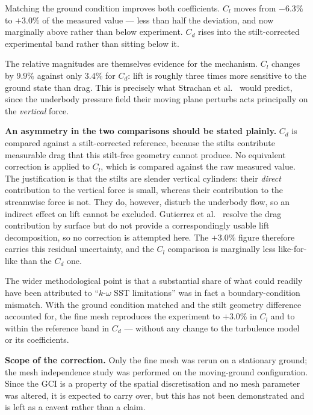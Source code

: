 \documentclass[12pt,a4paper]{article}
\begin{document}
\noindent
Matching the ground condition improves both coefficients. $C_l$ moves from $-6.3\%$ to $+3.0\%$ of
the measured value — less than half the deviation, and now marginally above rather than below
experiment. $C_d$ rises into the stilt-corrected experimental band rather than sitting below it.

The relative magnitudes are themselves evidence for the mechanism. $C_l$ changes by $9.9\%$ against
only $3.4\%$ for $C_d$: lift is roughly three times more sensitive to the ground state than drag.
This is precisely what Strachan et al.~\cite{strachan2007} would predict, since the underbody
pressure field their moving plane perturbs acts principally on the \emph{vertical} force.

\textbf{An asymmetry in the two comparisons should be stated plainly.} $C_d$ is compared against a
stilt-corrected reference, because the stilts contribute measurable drag that this stilt-free
geometry cannot produce. No equivalent correction is applied to $C_l$, which is compared against the
raw measured value. The justification is that the stilts are slender vertical cylinders: their
\emph{direct} contribution to the vertical force is small, whereas their contribution to the
streamwise force is not. They do, however, disturb the underbody flow, so an indirect effect on lift
cannot be excluded. Gutierrez et al.~\cite{gutierrez2020} resolve the drag contribution by surface
but do not provide a correspondingly usable lift decomposition, so no correction is attempted here.
The $+3.0\%$ figure therefore carries this residual uncertainty, and the $C_l$ comparison is
marginally less like-for-like than the $C_d$ one.

The wider methodological point is that a substantial share of what could readily have been
attributed to ``$k$-$\omega$ SST limitations'' was in fact a boundary-condition mismatch. With the
ground condition matched and the stilt geometry difference accounted for, the fine mesh reproduces
the experiment to $+3.0\%$ in $C_l$ and to within the reference band in $C_d$ — without any change
to the turbulence model or its coefficients.

\textbf{Scope of the correction.} Only the fine mesh was rerun on a stationary ground; the mesh
independence study was performed on the moving-ground configuration. Since the GCI is a property of
the spatial discretisation and no mesh parameter was altered, it is expected to carry over, but this
has not been demonstrated and is left as a caveat rather than a claim.
\end{document}
